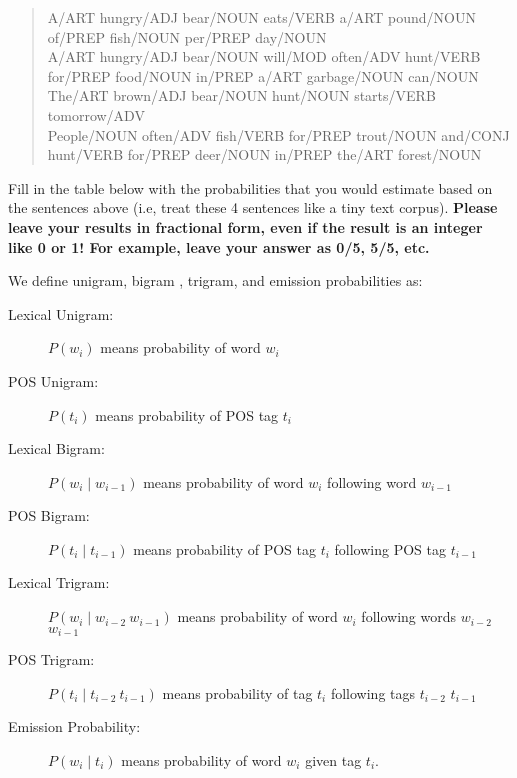 \documentclass[11pt]{article}
\begin{document}
\begin{enumerate}
\begin{quote}
A/ART hungry/ADJ bear/NOUN eats/VERB a/ART pound/NOUN of/PREP
fish/NOUN per/PREP day/NOUN  \\

A/ART hungry/ADJ bear/NOUN will/MOD often/ADV hunt/VERB for/PREP
food/NOUN in/PREP a/ART garbage/NOUN can/NOUN\\

The/ART brown/ADJ bear/NOUN hunt/NOUN starts/VERB tomorrow/ADV  \\

People/NOUN often/ADV fish/VERB for/PREP trout/NOUN and/CONJ hunt/VERB
for/PREP deer/NOUN in/PREP the/ART forest/NOUN
\end{quote}


Fill in the table below with the probabilities that you would estimate
based on the sentences above (i.e, treat these 4 sentences like a tiny
text corpus). {\bf Please leave your results in fractional
  form, even if the result is an integer like 0 or 1! For example,
  leave your answer as 0/5, 5/5, etc.}

\vspace*{.1in}
We define unigram, bigram , trigram, and emission probabilities as:
\begin{description}
\item[Lexical Unigram:] $P(w_i)$ means probability of word $w_i$
\item[POS Unigram:] $P(t_i)$ means probability of POS tag $t_i$
\item[Lexical Bigram:] $P(w_i \mid w_{i-1})$ means probability of word
  $w_i$ following word $w_{i-1}$
\item[POS Bigram:] $P(t_i \mid t_{i-1})$ means probability of POS
  tag $t_i$ following POS tag $t_{i-1}$
\item[Lexical Trigram:] $P(w_i \mid w_{i-2}~w_{i-1})$ means probability of word
  $w_i$ following words $w_{i-2}$ $w_{i-1}$
\item[POS Trigram:] $P(t_i \mid t_{i-2}~t_{i-1})$ means probability of tag
  $t_i$ following tags $t_{i-2}$ $t_{i-1}$
\item[Emission Probability:] $P(w_i \mid t_i)$ means
  probability of word $w_i$ given tag $t_i$.
\end{description}



\end{enumerate}
\end{document}
